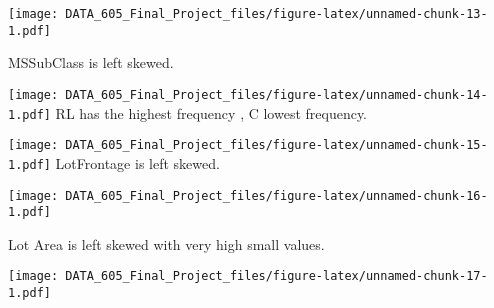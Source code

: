 \documentclass[]{article}
\newenvironment{Shaded}{\begin{snugshade}}{\end{snugshade}}
\newcommand{\DataTypeTok}[1]{\textcolor[rgb]{0.13,0.29,0.53}{#1}}
\newcommand{\KeywordTok}[1]{\textcolor[rgb]{0.13,0.29,0.53}{\textbf{#1}}}
\newcommand{\NormalTok}[1]{#1}
\newcommand{\OperatorTok}[1]{\textcolor[rgb]{0.81,0.36,0.00}{\textbf{#1}}}
\newcommand{\StringTok}[1]{\textcolor[rgb]{0.31,0.60,0.02}{#1}}
\begin{document}
\texttt{[image: DATA\_605\_Final\_Project\_files/figure-latex/unnamed-chunk-13-1.pdf]}

MSSubClass is left skewed.

\begin{Shaded}
\end{Shaded}

\texttt{[image: DATA\_605\_Final\_Project\_files/figure-latex/unnamed-chunk-14-1.pdf]}
RL has the highest frequency , C lowest frequency.

\begin{Shaded}
\end{Shaded}

\texttt{[image: DATA\_605\_Final\_Project\_files/figure-latex/unnamed-chunk-15-1.pdf]}
LotFrontage is left skewed.

\begin{Shaded}
\end{Shaded}

\texttt{[image: DATA\_605\_Final\_Project\_files/figure-latex/unnamed-chunk-16-1.pdf]}

Lot Area is left skewed with very high small values.

\begin{Shaded}
\end{Shaded}

\texttt{[image: DATA\_605\_Final\_Project\_files/figure-latex/unnamed-chunk-17-1.pdf]}
\end{document}
